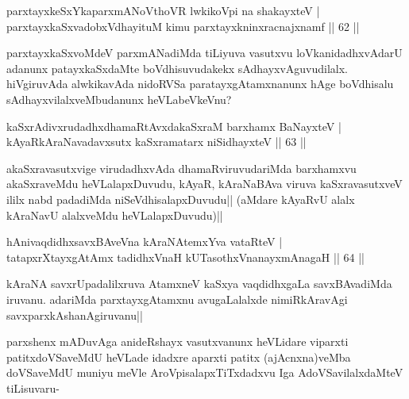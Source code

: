 
\begin{shl}
parxtayxkeSxYkaparxmANoV\s thoVR lwkikoV\s pi na shakayxteV |\\
parxtayxkaSxvadobxVdhayituM kimu parxtayxkninxracnajxnamf \hfill || 62 ||
\end{shl}

\begin{artha}
parxtayxkaSxvoMdeV parxmANadiMda tiLiyuva vasutxvu loVkanidadhxvAdarU adanunx patayxkaSxdaMte boVdhisuvudakekx sAdhayxvAguvudilalx. hiVgiruvAda alwkikavAda nidoRVSa paratayxgAtamxnanunx hAge boVdhisalu sAdhayxvilalxveMbudanunx heVLabeVkeVnu? 
\end{artha}


\begin{shl}
kaSxrAdivxrudadhxdhamaRtAvxdakaSxraM barxhamx BaNayxteV |\\
kAyaRkAraNavadavxsutx kaSxramatarx niSidhayxteV \hfill || 63 ||
\end{shl}

\begin{artha}
akaSxravasutxvige virudadhxvAda dhamaRviruvudariMda barxhamxvu akaSxraveMdu heVLalapxDuvudu, kAyaR, kAraNaBAva viruva kaSxravasutxveV ililx nabd padadiMda niSeVdhisalapxDuvudu|| (aMdare kAyaRvU alalx kAraNavU alalxveMdu heVLalapxDuvudu)||
\end{artha}


\begin{shl}
hAnivaqdidhxsavxBAveVna kAraNAtemxYva vataRteV |\\
tatapxrXtayxgAtAmx tadidhxVnaH kUTasothxV\s nanayxmAnagaH \hfill || 64 ||
\end{shl}

\begin{artha}
kAraNA savxrUpadalilxruva AtamxneV kaSxya vaqdidhxgaLa savxBAvadiMda iruvanu. adariMda parxtayxgAtamxnu avugaLalalxde nimiRkAravAgi savxparxkAshanAgiruvanu||

parxshenx mADuvAga anideRshayx vasutxvanunx heVLidare viparxti patitxdoVSaveMdU heVLade idadxre aparxti patitx (ajAcnxna)veMba doVSaveMdU muniyu meVle AroVpisalapxTiTxdadxvu Iga AdoVSavilalxdaMteV tiLisuvaru-
\end{artha}


